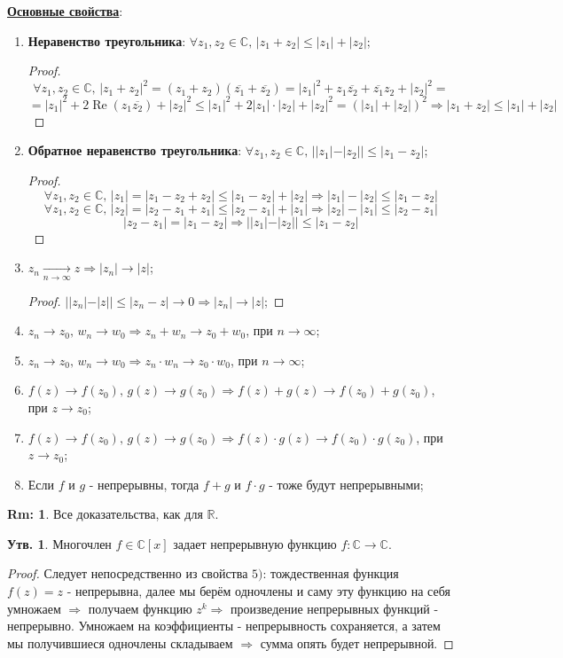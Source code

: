 \documentclass[12pt]{article}
\newcommand{\MR}{\mathbb{R}}
\newcommand{\MC}{\mathbb{C}}
\theoremstyle{definition}
\newtheorem{rem}{Rm:}
\newtheorem{prop}{Утв.}
\newcommand{\ovl}[1]{\overline{#1}}
\DeclareMathOperator{\RE}{\operatorname{Re}}
\begin{document}
\textbf{\uline{Основные свойства}}:
\begin{enumerate}[label=\arabic*)]
	\item \textbf{Неравенство треугольника}: $\forall z_1, z_2 \in \MC, \, |z_1 + z_2| \leq |z_1| + |z_2|$;
	\begin{proof}
		$$
			\forall z_1, z_2 \in \MC, \, |z_1 + z_2|^2 = (z_1 + z_2)(\ovl{z_1} + \ovl{z_2}) = |z_1|^2 + z_1\ovl{z_2} + \ovl{z_1}z_2 + |z_2|^2 =
		$$
		$$	
			= |z_1|^2 + 2\RE(z_1\ovl{z_2})  + |z_2|^2 \leq |z_1|^2 + 2|z_1|{\cdot}|z_2| + |z_2|^2 = (|z_1| + |z_2|)^2 \Rightarrow |z_1 + z_2| \leq |z_1| + |z_2|
		$$
		
	\end{proof}
	\item \textbf{Обратное неравенство треугольника}: $\forall z_1,z_2 \in \MC, \, ||z_1| - |z_2|| \leq |z_1 - z_2|$;
	\begin{proof}
		$$
			\forall z_1,z_2 \in \MC,\, |z_1| = |z_1 - z_2 + z_2| \leq |z_1 - z_2| + |z_2| \Rightarrow |z_1| - |z_2| \leq |z_1 - z_2|
		$$
		$$
			\forall z_1,z_2 \in \MC,\, |z_2| = |z_2 - z_1 + z_1| \leq |z_2 - z_1| + |z_1| \Rightarrow |z_2| - |z_1| \leq |z_2 - z_1| 
		$$
		$$
			|z_2 - z_1| = |z_1 - z_2| \Rightarrow ||z_1| - |z_2|| \leq |z_1 - z_2|	
		$$
	\end{proof}
	\item $z_n \xrightarrow[n\to \infty]{} z \Rightarrow |z_n| \to |z|$;
	\begin{proof}
		$||z_n| - |z|| \leq |z_n - z| \to 0 \Rightarrow |z_n| \to |z|$;
	\end{proof}
	\item $z_n \to z_0, \, w_n \to w_0 \Rightarrow z_n + w_n \to z_0 + w_0$, при $n \to \infty$;
	\item $z_n \to z_0, \, w_n \to w_0 \Rightarrow z_n{\cdot}w_n \to z_0{\cdot}w_0$, при $n \to \infty$;
	\item $f(z) \to f(z_0), \, g(z) \to g(z_0) \Rightarrow f(z) + g(z) \to f(z_0) + g(z_0)$, при $z \to z_0$;
	\item $f(z) \to f(z_0), \, g(z) \to g(z_0) \Rightarrow f(z){\cdot}g(z) \to f(z_0){\cdot}g(z_0)$, при $z \to z_0$;
	\item Если $f$ и $g$ - непрерывны, тогда $f + g$ и $f{\cdot}g$ - тоже будут непрерывными;
\end{enumerate}
\begin{rem}
	Все доказательства, как для $\MR$. 

\end{rem}
\begin{prop}
	Многочлен $f \in \MC[x]$ задает непрерывную функцию $f \colon \MC \to \MC$.
\end{prop}
\begin{proof}
	Следует непосредственно из свойства $5)$: тождественная функция $f(z) = z$ - непрерывна, далее мы берём одночлены и саму эту функцию на себя умножаем $\Rightarrow$ получаем функцию $z^k \Rightarrow$ произведение непрерывных функций - непрерывно. Умножаем на коэффициенты - непрерывность сохраняется, а затем мы получившиеся одночлены складываем $\Rightarrow$ сумма опять будет непрерывной.
\end{proof}
\end{document}

